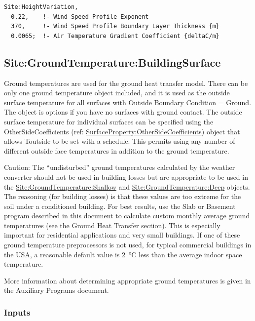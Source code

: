 \begin{lstlisting}
Site:HeightVariation,
  0.22,    !- Wind Speed Profile Exponent
  370,     !- Wind Speed Profile Boundary Layer Thickness {m}
  0.0065;  !- Air Temperature Gradient Coefficient {deltaC/m}
\end{lstlisting}

\subsection{Site:GroundTemperature:BuildingSurface}\label{sitegroundtemperaturebuildingsurface}

Ground temperatures are used for the ground heat transfer model. There can be only one ground temperature object included, and it is used as the outside surface temperature for all surfaces with Outside Boundary Condition = Ground. The object is options if you have no surfaces with ground contact. The outside surface temperature for individual surfaces can be specified using the OtherSideCoefficients (ref: \hyperref[surfacepropertyothersidecoefficients]{SurfaceProperty:OtherSideCoefficients}) object that allows Toutside to be set with a schedule. This permits using any number of different outside face temperatures in addition to the ground temperature.

\begin{callout}
Caution: The ``undisturbed'' ground temperatures calculated by the weather converter should not be used in building losses but are appropriate to be used in the \hyperref[sitegroundtemperatureshallow]{Site:GroundTemperature:Shallow} and \hyperref[sitegroundtemperaturedeep]{Site:GroundTemperature:Deep} objects. The reasoning (for building losses) is that these values are too extreme for the soil under a conditioned building. For best results, use the Slab or Basement program described in this document to calculate custom monthly average ground temperatures (see the Ground Heat Transfer section). This is especially important for residential applications and very small buildings. If one of these ground temperature preprocessors is not used, for typical commercial buildings in the USA, a reasonable default value is \SI{2}{\degreeCelsius} less than the average indoor space temperature.
\end{callout}

More information about determining appropriate ground temperatures is given in the Auxiliary Programs document.

\subsubsection{Inputs}\label{inputs-11-008}

